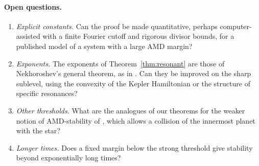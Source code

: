 \paragraph{Open questions.}
\begin{enumerate}
\item \emph{Explicit constants.} Can the proof be made quantitative, perhaps computer-assisted with a finite
  Fourier cutoff and rigorous divisor bounds, for a published model of a system with a large AMD margin?
\item \emph{Exponents.} The exponents of Theorem~\ref{thm:resonant} are those of Nekhoroshev's general theorem, as
  in \cite[Theorem~12.3]{Nek77}. Can they be improved on the sharp sublevel, using the convexity of the Kepler
  Hamiltonian or the structure of specific resonances?
\item \emph{Other thresholds.} What are the analogues of our theorems for the weaker notion of AMD-stability of
  \cite[\S5.3]{LP17}, which allows a collision of the innermost planet with the star?
\item \emph{Longer times.} Does a fixed margin below the strong threshold give stability beyond exponentially long
  times?
\end{enumerate}
